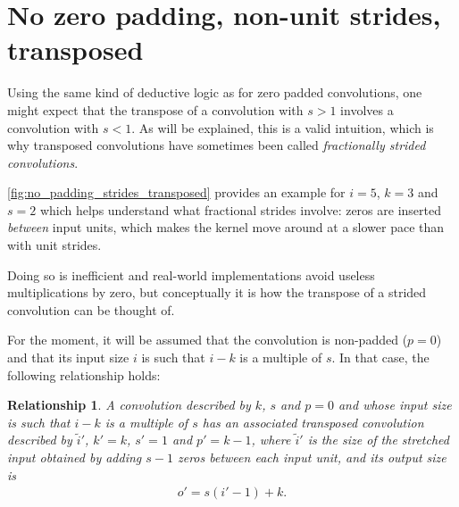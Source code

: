 \documentclass[notitlepage]{report}
\newtheorem{relationship}{Relationship}
\begin{document}
\section{No zero padding, non-unit strides, transposed}

Using the same kind of deductive logic as for zero padded convolutions, one
might expect that the transpose of a convolution with $s > 1$ involves a
convolution with $s < 1$. As will be explained, this is a valid intuition, which
is why transposed convolutions have sometimes been called {\em fractionally
strided convolutions}.

\autoref{fig:no_padding_strides_transposed} provides an example for $i = 5$, $k
= 3$ and $s = 2$ which helps understand what fractional strides involve: zeros
are inserted {\em between} input units, which makes the kernel move around at a
slower pace than with unit strides.

Doing so is inefficient and real-world implementations avoid useless
multiplications by zero, but conceptually it is how the transpose of a strided
convolution can be thought of.

For the moment, it will be assumed that the convolution is non-padded ($p = 0$)
and that its input size $i$ is such that $i - k$ is a multiple of $s$. In that
case, the following relationship holds:

\begin{relationship}\label{rel:no_padding_strides_transposed}
A convolution described by $k$, $s$ and $p = 0$ and whose input size is such
that $i - k$ is a multiple of $s$ has an associated transposed convolution
described by $\tilde{i}'$, $k' = k$, $s' = 1$ and $p' = k - 1$, where
$\tilde{i}'$ is the size of the stretched input obtained by adding $s - 1$ zeros
between each input unit, and its output size is
\begin{equation*}
\begin{split}
    o' = s (i' - 1) + k.
\end{split}
\end{equation*}
\end{relationship}
\end{document}
